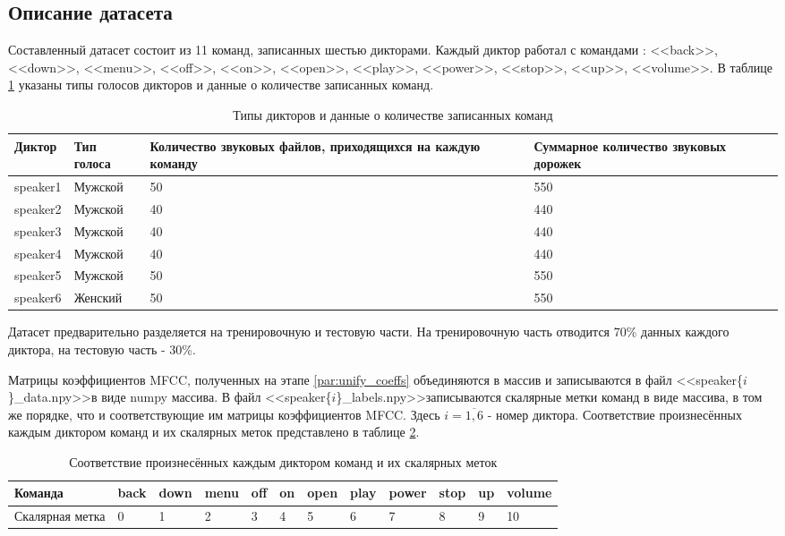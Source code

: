\subsection{Описание датасета}
Составленный датасет состоит из 11 команд, записанных шестью дикторами. Каждый диктор работал с командами : <<back>>, <<down>>, <<menu>>, <<off>>, <<on>>, <<open>>, <<play>>, <<power>>, <<stop>>, <<up>>, <<volume>>. В таблице \ref{table:dataset} указаны типы голосов дикторов и данные о количестве записанных команд.
\begin{table}[H]
\begin{tabular}[c]{ | p{1.8cm} | p{2.5cm} | p{6cm} | p{4cm} | }
	\hline
	Диктор & Тип голоса & Количество звуковых файлов, приходящихся на каждую команду & Суммарное количество звуковых дорожек  \\ \hline
	speaker1 & Мужской & 50 & 550 \\
	speaker2 & Мужской & 40 & 440 \\
	speaker3 & Мужской & 40 & 440 \\
	speaker4 & Мужской & 40 & 440 \\
	speaker5 & Мужской & 50 & 550 \\
	speaker6 & Женский & 50 & 550 \\ \hline
	
\end{tabular}
\caption{\label{table:dataset}Типы дикторов и данные о количестве записанных команд}
\end{table}

Датасет предварительно разделяется на тренировочную и тестовую части. На тренировочную часть отводится 70\% данных каждого диктора, на тестовую часть - 30\%.

\label{par:saving_preprocessed_data}
Матрицы коэффициентов MFCC, полученных на этапе \ref{par:unify_coeffs} объединяются в массив и записываются в файл <<speaker\{$i$\}\_data.npy>>\footnotemark[\value{footnote}] \space в виде numpy массива. В файл <<speaker\{$i$\}\_labels.npy>>\footnotemark[\value{footnote}] записываются скалярные метки команд в виде массива, в том же порядке, что и соответствующие им матрицы коэффициентов MFCC. Здесь $i=\overline{1,6}$  - номер диктора. Соответствие произнесённых каждым диктором команд и их скалярных меток представлено в таблице \ref{table:commands}.


\begin{table}[H]
	\small
	\begin{tabular}[c]{ | l | l | l | l | l | l | l | l | l | l | l | l |}
		\hline
		Команда	 &  back & down & menu & off & on & open & play & power & stop & up & volume \\ \hline
		Скалярная метка & 0 & 1 & 2 & 3 & 4 & 5 & 6 & 7 & 8 & 9 & 10 \\ \hline
		
	\end{tabular}
	\caption{\label{table:commands}Соответствие произнесённых каждым диктором команд и их скалярных меток}
\end{table}
